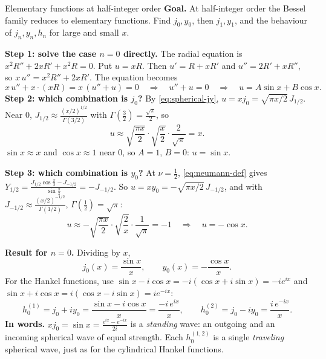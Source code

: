 \documentclass[11pt]{beamer}
\begin{document}
\begin{frame}[allowframebreaks=1.00]{Elementary functions at half-integer order}
\footnotesize
\textbf{Goal.} At half-integer order the Bessel family reduces to elementary functions. Find \(j_0,y_0\),
then \(j_1,y_1\), and the behaviour of \(j_n,y_n,h_n\) for large and small \(x\).

\textbf{Step 1: solve the case \(n=0\) directly.} The radial equation is \(x^2R''+2xR'+x^2R=0\). Put \(u=xR\).
Then \(u'=R+xR'\) and \(u''=2R'+xR''\), so \(x\,u''=x^2R''+2xR'\). The equation becomes
\[
 x\,u''+x\cdot(xR)=x\,(u''+u)=0
 \quad\Longrightarrow\quad u''+u=0
 \quad\Longrightarrow\quad u=A\sin x+B\cos x .
\]
\textbf{Step 2: which combination is \(j_0\)?} By \eqref{eq:spherical-jy}, \(u=xj_0=\sqrt{\pi x/2}\,J_{1/2}\). Near \(0\),
\(J_{1/2}\approx\frac{(x/2)^{1/2}}{\Gamma(3/2)}\) with \(\Gamma(\frac32)=\frac{\sqrt\pi}2\), so
\[
 u\approx\sqrt{\frac{\pi x}{2}}\cdot\sqrt{\frac x2}\cdot\frac{2}{\sqrt\pi}=x .
\]
\(\sin x\approx x\) and \(\cos x\approx1\) near \(0\), so \(A=1\), \(B=0\): \(u=\sin x\).

\textbf{Step 3: which combination is \(y_0\)?} At \(\nu=\frac12\), \eqref{eq:neumann-def} gives
\(Y_{1/2}=\frac{J_{1/2}\cos\frac\pi2-J_{-1/2}}{\sin\frac\pi2}=-J_{-1/2}\). So \(u=xy_0=-\sqrt{\pi x/2}\,J_{-1/2}\), and with
\(J_{-1/2}\approx\frac{(x/2)^{-1/2}}{\Gamma(1/2)}\), \(\Gamma(\frac12)=\sqrt\pi\):
\[
 u\approx-\sqrt{\frac{\pi x}{2}}\cdot\sqrt{\frac2x}\cdot\frac{1}{\sqrt\pi}=-1
 \quad\Longrightarrow\quad u=-\cos x .
\]


\textbf{Result for \(n=0\).} Dividing by \(x\),
\[
 j_0(x)=\frac{\sin x}{x},\qquad y_0(x)=-\frac{\cos x}{x}.
\]
For the Hankel functions, use \(\sin x-i\cos x=-i(\cos x+i\sin x)=-ie^{ix}\) and
\(\sin x+i\cos x=i(\cos x-i\sin x)=ie^{-ix}\):
\[
 h_0^{(1)}=j_0+iy_0=\frac{\sin x-i\cos x}{x}=\frac{-i\,e^{ix}}{x},\qquad
 h_0^{(2)}=j_0-iy_0=\frac{i\,e^{-ix}}{x}.
\]
\textbf{In words.} \(xj_0=\sin x=\frac{e^{ix}-e^{-ix}}{2i}\) is a \emph{standing} wave: an outgoing and an incoming
spherical wave of equal strength. Each \(h_0^{(1,2)}\) is a single \emph{traveling} spherical wave, just as
for the cylindrical Hankel functions.



\end{frame}
\end{document}
